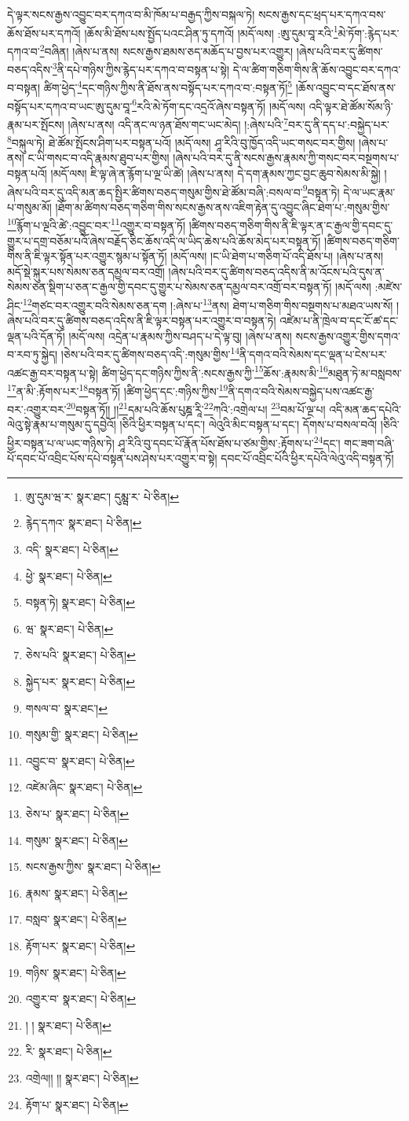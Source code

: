 དེ་ལྟར་སངས་རྒྱས་འབྱུང་བར་དཀའ་བ་མི་ཁོམ་པ་བརྒྱད་ཀྱིས་བསྐལ་ཏེ། སངས་རྒྱས་དང་ཕྲད་པར་དཀའ་བས་ཆོས་ཐོས་པར་དཀའོ། །ཆོས་མི་ཐོས་པས་སྤྱོད་པའང་ཤིན་ཏུ་དཀའོ། །མདོ་ལས། :ཨུ་དུམ་བཱ་རའི་\footnote{ཨུ་དུམ་ཝ་ར་  སྣར་ཐང་། དུམྺ་ར་  པེ་ཅིན། }མེ་ཏོག་:རྙེད་པར་དཀའ་བ་\footnote{རྙེད་དཀའ་  སྣར་ཐང་།  པེ་ཅིན། }བཞིན། །ཞེས་པ་ནས། སངས་རྒྱས་ཐམས་ཅད་མཆོད་པ་བྱས་པར་འགྱུར། །ཞེས་པའི་བར་དུ་ཚིགས་བཅད་འདིས་\footnote{འདི་  སྣར་ཐང་།  པེ་ཅིན། }ནི་དཔེ་གཉིས་ཀྱིས་རྙེད་པར་དཀའ་བ་བསྟན་པ་སྟེ། དེ་ལ་ཚིག་གཅིག་གིས་ནི་ཆོས་འབྱུང་བར་དཀའ་བ་བསྟན། ཚིག་ཕྱེད་\footnote{ཕྱེ་  སྣར་ཐང་།  པེ་ཅིན། }དང་གཉིས་ཀྱིས་ནི་ཐོས་ནས་བསྟོད་པར་དཀའ་བ་:བསྟན་ཏོ།\footnote{བསྟན་ཏེ།  སྣར་ཐང་།  པེ་ཅིན། } །ཆོས་འབྱུང་བ་དང་ཐོས་ནས་བསྟོད་པར་དཀའ་བ་ཡང་ཨུ་དུམ་བཱ་\footnote{ཝ་  སྣར་ཐང་།  པེ་ཅིན། }རའི་མེ་ཏོག་དང་འདྲའོ་ཞེས་བསྟན་ཏོ། །མདོ་ལས། འདི་ལྟར་ཐེ་ཚོམ་སོམ་ཉི་རྣམ་པར་སྤོངས། །ཞེས་པ་ནས། འདི་ནང་ལ་ཉན་ཐོས་གང་ཡང་མེད། །:ཞེས་པའི་\footnote{ཅེས་པའི་  སྣར་ཐང་།  པེ་ཅིན། }བར་དུ་ནི་དད་པ་:བསྐྱེད་པར་\footnote{སྐྱེད་པར་  སྣར་ཐང་།  པེ་ཅིན། }བསྐུལ་ཏེ། ཐེ་ཚོམ་སྤོངས་ཤིག་པར་བསྟན་པའོ། །མདོ་ལས། ཤཱ་རིའི་བུ་ཁྱོད་འདི་ཡང་གསང་བར་གྱིས། །ཞེས་པ་ནས། ང་ཡི་གསང་བ་འདི་རྣམས་ཐུབ་པར་གྱིས། །ཞེས་པའི་བར་དུ་ནི་སངས་རྒྱས་རྣམས་ཀྱི་གསང་བར་བསྔགས་པ་བསྟན་པའོ། །མདོ་ལས། ཇི་ལྟ་ཞེ་ན་རྙོག་པ་ལྔ་ཡི་ཚེ། །ཞེས་པ་ནས། དེ་དག་རྣམས་ཀྱང་བྱང་ཆུབ་སེམས་མི་སྐྱེ། །ཞེས་པའི་བར་དུ་འདི་མན་ཆད་སྤྱིར་ཚིགས་བཅད་གསུམ་གྱིས་ཐེ་ཚོམ་བཞི་:བསལ་བ་\footnote{གསལ་བ་  སྣར་ཐང་། }བསྟན་ཏེ། དེ་ལ་ཡང་རྣམ་པ་གསུམ་མོ། །ཐོག་མ་ཚིགས་བཅད་གཅིག་གིས་སངས་རྒྱས་ནས་འཇིག་རྟེན་དུ་འབྱུང་ཞིང་ཐེག་པ་:གསུམ་གྱིས་\footnote{གསུམ་གྱི་  སྣར་ཐང་།  པེ་ཅིན། }རྙོག་པ་ལྔའི་ཚེ་:འབྱུང་བར་\footnote{འབྱུང་བ་  སྣར་ཐང་།  པེ་ཅིན། }འགྱུར་བ་བསྟན་ཏོ། །ཚིགས་བཅད་གཅིག་གིས་ནི་ཇི་ལྟར་ན་ང་རྒྱལ་གྱི་དབང་དུ་གྱུར་པ་དགྲ་བཅོམ་པའོ་ཞེས་བརྗོད་ཅིང་ཆོས་འདི་ལ་ཡིད་ཆེས་པའི་ཆོས་མེད་པར་བསྟན་ཏོ། །ཚིགས་བཅད་གཅིག་གིས་ནི་ཇི་ལྟར་སྟོན་པར་འགྱུར་སྙམ་པ་སྟོན་ཏོ། །མདོ་ལས། །ང་ཡི་ཐེག་པ་གཅིག་པོ་འདི་ཐོས་པ། །ཞེས་པ་ནས། མདོ་སྡེ་སྐུར་པས་སེམས་ཅན་དམྱལ་བར་འགྲོ། །ཞེས་པའི་བར་དུ་ཚིགས་བཅད་འདིས་ནི་མ་འོངས་པའི་དུས་ན་སེམས་ཅན་སྡིག་པ་ཅན་ང་རྒྱལ་གྱི་དབང་དུ་གྱུར་པ་སེམས་ཅན་དམྱལ་བར་འགྲོ་བར་བསྟན་ཏོ། །མདོ་ལས། :མཛེས་ཤིང་\footnote{འཛེམ་ཞིང་  སྣར་ཐང་།  པེ་ཅིན། }གཙང་བར་འགྱུར་བའི་སེམས་ཅན་དག །:ཞེས་པ་\footnote{ཅེས་པ་  སྣར་ཐང་།  པེ་ཅིན། }ནས། ཐེག་པ་གཅིག་གིས་བསྔགས་པ་མཐའ་ཡས་སོ། །ཞེས་པའི་བར་དུ་ཚིགས་བཅད་འདིས་ནི་ཇི་ལྟར་བསྟན་པར་འགྱུར་བ་བསྟན་ཏེ། འཛེམ་པ་ནི་ཁྲེལ་བ་དང་ངོ་ཚ་དང་ལྡན་པའི་དོན་ཏོ། །མདོ་ལས། འདྲེན་པ་རྣམས་ཀྱིས་བཤད་པ་དེ་ལྟ་བུ། །ཞེས་པ་ནས། སངས་རྒྱས་འགྱུར་གྱིས་དགའ་བ་རབ་ཏུ་སྐྱེད། །ཅེས་པའི་བར་དུ་ཚིགས་བཅད་འདི་:གསུམ་གྱིས་\footnote{གསུམ་  སྣར་ཐང་།  པེ་ཅིན། }ནི་དགའ་བའི་སེམས་དང་ལྡན་པ་ངེས་པར་འཚང་རྒྱ་བར་བསྟན་པ་སྟེ། ཚིག་ཕྱེད་དང་གཉིས་ཀྱིས་ནི་:སངས་རྒྱས་ཀྱི་\footnote{སངས་རྒྱས་ཀྱིས་  སྣར་ཐང་།  པེ་ཅིན། }ཆོས་:རྣམས་མི་\footnote{རྣམས་  སྣར་ཐང་།  པེ་ཅིན། }མཐུན་ཏེ་མ་བསླབས་\footnote{བསླབ་  སྣར་ཐང་།  པེ་ཅིན། }ན་མི་:རྟོགས་པར་\footnote{རྟོག་པར་  སྣར་ཐང་།  པེ་ཅིན། }བསྟན་ཏོ། །ཚིག་ཕྱེད་དང་:གཉིས་ཀྱིས་\footnote{གཉིས་  སྣར་ཐང་།  པེ་ཅིན། }ནི་དགའ་བའི་སེམས་བསྐྱེད་པས་འཚང་རྒྱ་བར་:འགྱུར་བར་\footnote{འགྱུར་བ་  སྣར་ཐང་།  པེ་ཅིན། }བསྟན་ཏོ།། །།\footnote{། །  སྣར་ཐང་།  པེ་ཅིན། }དམ་པའི་ཆོས་པུཎྜ་རཱི་\footnote{རི་  སྣར་ཐང་།  པེ་ཅིན། }ཀའི་:འགྲེལ་པ། \footnote{འགྲེལ།། །།   སྣར་ཐང་།  པེ་ཅིན། }བམ་པོ་ལྔ་པ། འདི་མན་ཆད་དཔེའི་ལེའུ་སྟེ་རྣམ་པ་གསུམ་དུ་དབྱེའོ། །ཅིའི་ཕྱིར་བསྟན་པ་དང་། ལེའུའི་མིང་བསྟན་པ་དང་། དོགས་པ་བསལ་བའོ། །ཅིའི་ཕྱིར་བསྟན་པ་ལ་ཡང་གཉིས་ཏེ། ཤཱ་རིའི་བུ་དབང་པོ་རྣོན་པོས་ཐོས་པ་ཙམ་གྱིས་:རྟོགས་པ་\footnote{རྟོག་པ་  སྣར་ཐང་།  པེ་ཅིན། }དང་། གང་ཟག་བཞི་པོ་དབང་པོ་འབྲིང་པོས་དཔེ་བསྟན་པས་ཤེས་པར་འགྱུར་བ་སྟེ། དབང་པོ་འབྲིང་པོའི་ཕྱིར་དཔེའི་ལེའུ་འདི་བསྟན་ཏོ། 